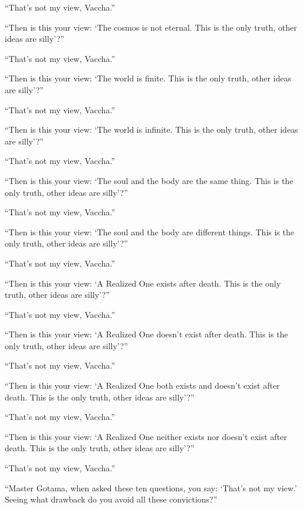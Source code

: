 \documentclass[12pt,openany]{book}%
\begin{document}
“That’s not my view, Vaccha.” 

“Then is this your view: ‘The cosmos is not eternal. This is the only truth, other ideas are silly’?” 

“That’s not my view, Vaccha.” 

“Then is this your view: ‘The world is finite. This is the only truth, other ideas are silly’?” 

“That’s not my view, Vaccha.” 

“Then is this your view: ‘The world is infinite. This is the only truth, other ideas are silly’?” 

“That’s not my view, Vaccha.” 

“Then is this your view: ‘The soul and the body are the same thing. This is the only truth, other ideas are silly’?” 

“That’s not my view, Vaccha.” 

“Then is this your view: ‘The soul and the body are different things. This is the only truth, other ideas are silly’?” 

“That’s not my view, Vaccha.” 

“Then is this your view: ‘A Realized One exists after death. This is the only truth, other ideas are silly’?” 

“That’s not my view, Vaccha.” 

“Then is this your view: ‘A Realized One doesn’t exist after death. This is the only truth, other ideas are silly’?” 

“That’s not my view, Vaccha.” 

“Then is this your view: ‘A Realized One both exists and doesn’t exist after death. This is the only truth, other ideas are silly’?” 

“That’s not my view, Vaccha.” 

“Then is this your view: ‘A Realized One neither exists nor doesn’t exist after death. This is the only truth, other ideas are silly’?” 

“That’s not my view, Vaccha.” 

“Master Gotama, when asked these ten questions, you say: ‘That’s not my view.’ Seeing what drawback do you avoid all these convictions?” 
\end{document}
